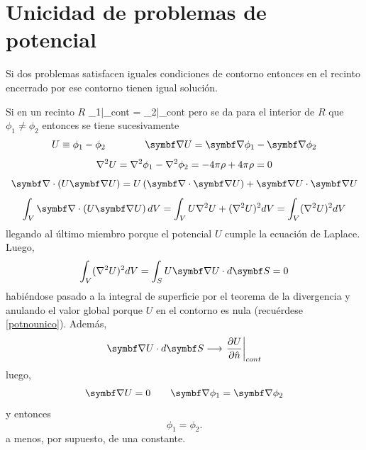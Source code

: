 \documentclass[10pt,oneside]{CBFT_book}
\begin{document}
\section{Unicidad de problemas de potencial}

Si dos problemas satisfacen iguales condiciones de contorno entonces en el recinto encerrado por
ese contorno tienen igual solución.

Si en un recinto $R$
\be
	\phi_1|_{cont} = \phi_2|_{cont}
	\label{potnounico}
\ee
pero se da para el interior de $R$ que $\phi_1\neq\phi_2$ entonces se tiene sucesivamente
\[
	U \equiv \phi_1 - \phi_2 \qquad \qquad \Nabla U = \Nabla \phi_1 - \Nabla \phi_2
\]
\[
	\nabla^2{U} = \nabla^2{\phi_1} - \nabla^2{\phi_2} = -4\pi \rho + 4\pi\rho = 0
\]
\[
	\Nabla\cdot\left( U\Nabla U \right) = U\left( \Nabla\cdot\Nabla U \right) + \Nabla U \cdot \Nabla U
\]
\[
	\int_V \Nabla\cdot\left( U\Nabla U \right) dV = \int_V U \lapm{U}  + (\lapm{U})^2 dV =  \int_V (\lapm{U})^2 dV
\]
llegando al último miembro porque el potencial $U$ cumple la ecuación de Laplace. Luego,
\[
	\int_V (\lapm{U})^2 dV = \int_S U\Nabla{U} \cdot d\vb{S} = 0
\]
habiéndose pasado a la integral de superficie por el teorema de la divergencia y anulando el valor global porque 
$U$ en el contorno es nula (recuérdese \eqref{potnounico}). Además, 
\[
	\Nabla{U} \cdot d\vb{S}  \longrightarrow \left.\dpar{U}{\hat{n}}\right|_{cont}
\]
luego,
\[
	\Nabla U = 0 \qquad \Nabla\phi_1 = \Nabla\phi_2 
\]
y entonces
\[
	\phi_1 = \phi_2 .
\]
a menos, por supuesto, de una constante.



\end{document}
